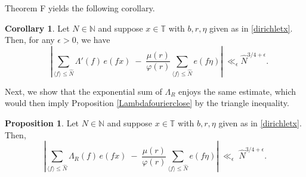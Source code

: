 \documentclass{article}
\theoremstyle{definition}
\newtheorem{cor}{Corollary}[section]
\newtheorem{prop}{Proposition}[section]
\theoremstyle{definition}
\theoremstyle{remark}
\newcommand{\N}{\mathbb{N}}
\renewcommand\phi\varphi
\newcommand{\1}{\mathbf{1}}
\numberwithin{equation}{section}
\begin{document}
Theorem F yields the following corollary. 

\begin{cor}\label{prop:FourierLambda'}
Let $N\in \N$ and suppose $x\in \mathbb{T}$ with $b,r,\eta$ given as in \eqref{dirichletx}. Then, for any $\epsilon>0$, we have
\[
\quad\left|
   \sum_{\langle f\rangle\leq \widehat{N} } \Lambda'(f)\,e(fx)
   \;-\;
   \frac{\mu(r)}{\phi(r)}\sum_{\langle f\rangle\le \widehat{N}}e(f\eta)
\right|
\;
\ll_\epsilon
\widehat{N}^{3\slash 4+\epsilon}.
\]
\end{cor}


Next, we show that the exponential sum of $\Lambda_R$ enjoys the same estimate, which would then imply Proposition \ref{Lambdafourierclose} by the triangle inequality. 
\begin{prop}\label{prop:FourierLambda_R}
Let $N\in \N$ and suppose $x\in \mathbb{T}$ with $b,r,\eta$ given as in \eqref{dirichletx}. Then, 
\begin{equation}
\left|
   \sum_{\langle f\rangle\leq \widehat{N} } \Lambda_R(f)\,e(fx)
   \;-\;
   \frac{\mu(r)}{\phi(r)}
   \sum_{\langle f\rangle\leq \widehat{N}} e(f\eta)
\right|
\;\ll_\epsilon\;
\widehat{N}^{3\slash 4+\epsilon}.
\end{equation}
\end{prop}
\end{document}
